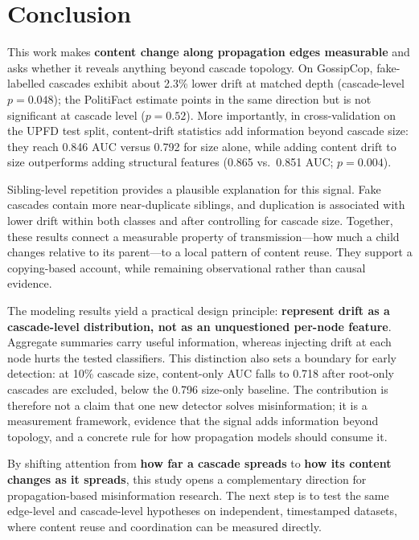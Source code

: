 \documentclass[10pt,twocolumn]{article}
\begin{document}
\section{Conclusion}
\label{sec:conclusion}

This work makes \textbf{content change along propagation edges measurable} and
asks whether it reveals anything beyond cascade topology. On GossipCop,
fake-labelled cascades exhibit about 2.3\% lower drift at matched depth
(cascade-level $p=0.048$); the PolitiFact estimate points in the same direction
but is not significant at cascade level ($p=0.52$). More importantly, in
cross-validation on the UPFD test split, content-drift statistics add
information beyond cascade size: they reach 0.846 AUC versus 0.792 for size
alone, while adding content drift to size outperforms adding structural features
(0.865 vs.\ 0.851 AUC; $p=0.004$).

Sibling-level repetition provides a plausible explanation for this signal. Fake
cascades contain more near-duplicate siblings, and duplication is associated
with lower drift within both classes and after controlling for cascade size.
Together, these results connect a measurable property of transmission---how
much a child changes relative to its parent---to a local pattern of content
reuse. They support a copying-based account, while remaining observational
rather than causal evidence.

The modeling results yield a practical design principle:
\textbf{represent drift as a cascade-level distribution, not as an
unquestioned per-node feature}. Aggregate summaries carry useful information,
whereas injecting drift at each node hurts the tested classifiers. This
distinction also sets a boundary for early detection: at 10\% cascade size,
content-only AUC falls to 0.718 after root-only cascades are excluded, below the
0.796 size-only baseline. The contribution is therefore not a claim that one
new detector solves misinformation; it is a measurement framework, evidence
that the signal adds information beyond topology, and a concrete rule for how
propagation models should consume it.

By shifting attention from \textbf{how far a cascade spreads} to \textbf{how
its content changes as it spreads}, this study opens a complementary direction
for propagation-based misinformation research. The next step is to test the
same edge-level and cascade-level hypotheses on independent, timestamped
datasets, where content reuse and coordination can be measured directly.
\end{document}
